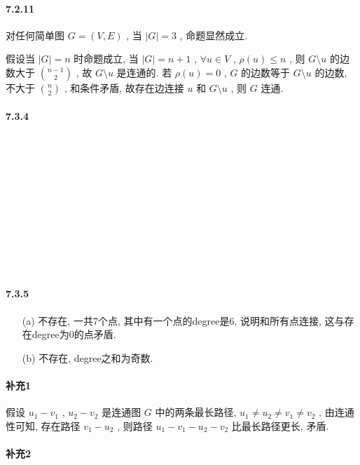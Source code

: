 \documentclass[a4paper, UTF8]{ctexart}				%
\numberwithin{equation}{section}				%
\begin{document}
    \paragraph{7.2.11}\quad
         对任何简单图 $G = (V, E)$ , 当 $\vert{G}\vert = 3$ , 命题显然成立.
         
         假设当 $\vert{G}\vert = n$ 时命题成立, 当 $\vert{G}\vert = n + 1$ , $\forall u \in V$ , $\rho(u) \le n$ , 则 $G \setminus u$ 的边数大于 ${n-1 \choose 2}$ , 故 $G \setminus u$ 是连通的. 若 $\rho(u) = 0$ , $G$ 的边数等于 $G \setminus u$ 的边数, 不大于 ${n \choose 2}$ , 和条件矛盾, 故存在边连接 $u$ 和 $G \setminus u$ , 则 $G$ 连通.
    \paragraph{7.3.4}\quad 
        \\
        \\
        \\
        \\
        \\
        \\
        \\
        \\
        \\
        \\
    \paragraph{7.3.5}\quad 
        \begin{itemize}
            \item[(a)] 不存在, 一共7个点, 其中有一个点的degree是6, 说明和所有点连接, 这与存在degree为0的点矛盾.
            \item[(b)] 不存在, degree之和为奇数.
        \end{itemize}
    \paragraph{补充1}\quad 
        假设 $u_1-v_1$ , $u_2-v_2$ 是连通图 $G$ 中的两条最长路径, $u_1 \neq u_2 \neq v_1 \neq v_2$ , 由连通性可知, 存在路径 $v_1-u_2$ , 则路径 $u_1-v_1-u_2-v_2$ 比最长路径更长, 矛盾.
    \paragraph{补充2}\quad 
        \\
        \\
        \\
        \\
        \\
        \\
        \\
        \\
        \\
        \\
\end{document}
